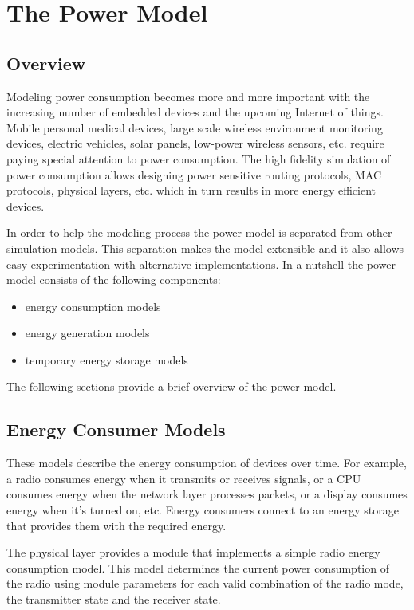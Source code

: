 \chapter{The Power Model}
\label{cha:power}

\section{Overview}

Modeling power consumption becomes more and more important with the increasing
number of embedded devices and the upcoming Internet of things. Mobile personal
medical devices, large scale wireless environment monitoring devices, electric
vehicles, solar panels, low-power wireless sensors, etc. require paying special
attention to power consumption. The high fidelity simulation of power
consumption allows designing power sensitive routing protocols, MAC protocols,
physical layers, etc. which in turn results in more energy efficient devices.

In order to help the modeling process the power model is separated from other
simulation models. This separation makes the model extensible and it also allows
easy experimentation with alternative implementations. In a nutshell the power
model consists of the following components:

\begin{itemize}
  \item energy consumption models
  \item energy generation models
  \item temporary energy storage models
\end{itemize}

The following sections provide a brief overview of the power model.

\section{Energy Consumer Models}

These models describe the energy consumption of devices over time. For example,
a radio consumes energy when it transmits or receives signals, or a CPU consumes
energy when the network layer processes packets, or a display consumes energy
when it's turned on, etc. Energy consumers connect to an energy storage that
provides them with the required energy.

The physical layer provides a  module that 
implements a simple radio energy consumption model. This model determines the
current power consumption of the radio using module parameters for each valid
combination of the radio mode, the transmitter state and the receiver state.

